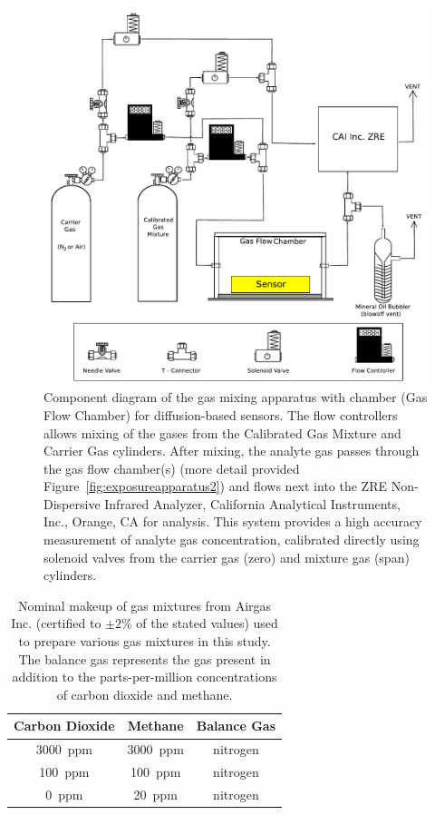\documentclass[times]{joehreview}
\begin{document}
	\begin{figure}[!t]
		\centering
		\includegraphics[width=\columnwidth]{honey1.pdf}
		\caption{Component diagram of the gas mixing apparatus with chamber (Gas Flow Chamber) for diffusion-based sensors.  The flow controllers allows mixing of the gases from the Calibrated Gas Mixture and Carrier Gas cylinders.  After mixing, the analyte gas passes through the gas flow chamber(s) (more detail provided Figure~\ref{fig:exposureapparatus2}) and flows next into the ZRE Non-Dispersive Infrared Analyzer, California Analytical Instruments, Inc., Orange, CA for analysis.  This system provides a high accuracy measurement of analyte gas concentration, calibrated directly using solenoid valves from the carrier gas (zero) and mixture gas (span) cylinders.}
		\label{fig:exposureapparatus}
	\end{figure}
	
	\begin{table}[!t]
		\caption{Nominal makeup of gas mixtures from Airgas Inc. (certified to $\pm 2$\% of the stated values) used to prepare various gas mixtures in this study.  The balance gas represents the gas present in addition to the parts-per-million concentrations of carbon dioxide and methane.}
		\label{tab:ratios}
		\small
		\centering
		\begin{tabular}{c | c | c}
			Carbon Dioxide & Methane  & Balance Gas \\ \hline
			3000~ppm       & 3000~ppm & nitrogen    \\
			100~ppm        & 100~ppm  & nitrogen    \\
			0~ppm          & 20~ppm   & nitrogen
		\end{tabular} 
	\end{table}
	
\end{document}
